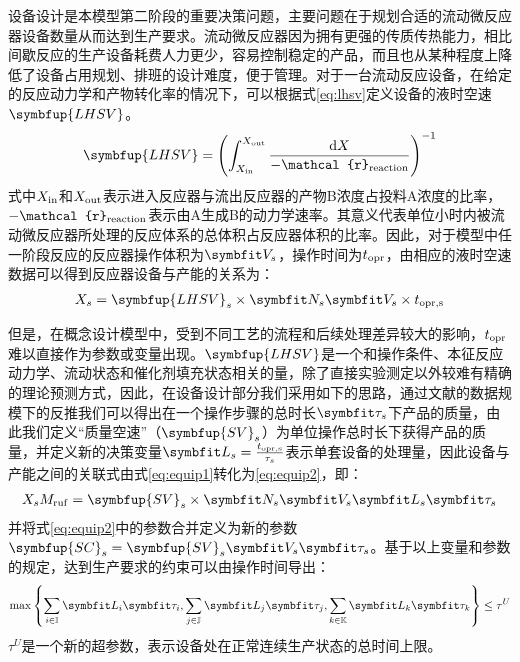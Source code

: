 设备设计是本模型第二阶段的重要决策问题，主要问题在于规划合适的流动微反应器设备数量从而达到生产要求。流动微反应器因为拥有更强的传质传热能力，相比间歇反应的生产设备耗费人力更少，容易控制稳定的产品，而且也从某种程度上降低了设备占用规划、排班的设计难度，便于管理。对于一台流动反应设备，在给定的反应动力学和产物转化率的情况下，可以根据式\eqref{eq:lhsv}定义设备的液时空速$\symbfup {LHSV}$。
\begin{align}
  \symbfup{LHSV} = \left(\int_{X_{\rm in}}^{X_{\rm out}}\frac{\mathrm{d}X}{-\mathcal{r}_{\rm reaction}}\right)^{-1} \label{eq:lhsv}
\end{align}
式中$X_{\rm in}$和$X_{\rm out}$表示进入反应器与流出反应器的产物B浓度占投料A浓度的比率，$-\mathcal{r}_{\rm reaction}$表示由A生成B的动力学速率。其意义代表单位小时内被流动微反应器所处理的反应体系的总体积占反应器体积的比率。因此，对于模型中任一阶段反应的反应器操作体积为$\symbfit V_s$，操作时间为$t_{\rm opr}$，由相应的液时空速数据可以得到反应器设备与产能的关系为：
\begin{align}
  X_s = \symbfup{LHSV}_s\times\symbfit N_s\symbfit V_s\times t_{\rm{opr},s} \label{eq:equip1}
\end{align}

但是，在概念设计模型中，受到不同工艺的流程和后续处理差异较大的影响，$t_{\rm opr}$难以直接作为参数或变量出现。$\symbfup{LHSV}$是一个和操作条件、本征反应动力学、流动状态和催化剂填充状态相关的量，除了直接实验测定以外较难有精确的理论预测方式，因此，在设备设计部分我们采用如下的思路，通过文献的数据规模下的反推我们可以得出在一个操作步骤的总时长$\symbfit \tau_s$下产品的质量，由此我们定义“质量空速”（$\symbfup{SV}_s$）为单位操作总时长下获得产品的质量，并定义新的决策变量$\symbfit L_s=\frac{t_{\rm{opr},s}}{\tau_s}$表示单套设备的处理量，因此设备与产能之间的关联式由式\eqref{eq:equip1}转化为\eqref{eq:equip2}，即：
\begin{align}
  X_sM_{\rm ruf} = \symbfup{SV}_s\times\symbfit N_s\symbfit V_s\symbfit L_s\symbfit\tau_{s} \label{eq:equip2}
\end{align}
并将式\eqref{eq:equip2}中的参数合并定义为新的参数$\symbfup{SC}_s = \symbfup{SV}_s\symbfit V_s\symbfit\tau_{s}$。基于以上变量和参数的规定，达到生产要求的约束可以由操作时间导出：
\begin{align}
  \max\left\{\sum_{i\in\mathbb I}\symbfit L_i\symbfit\tau_i,\sum_{j\in\mathbb J}\symbfit L_j\symbfit\tau_j,\sum_{k\in\mathbb K}\symbfit L_k\symbfit\tau_k\right\} \le \tau^U
\end{align}
$\tau^U$是一个新的超参数，表示设备处在正常连续生产状态的总时间上限。

